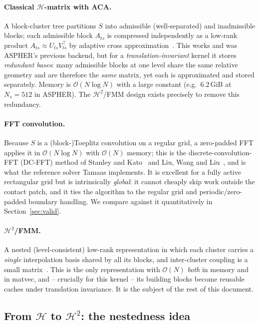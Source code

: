 \documentclass[11pt,a4paper]{article}
\newcommand{\Order}{\mathcal{O}}
\newcommand{\Htwo}{\mathcal{H}^2}
\newcommand{\Hmat}{\mathcal{H}}
\theoremstyle{definition}
\theoremstyle{remark}
\begin{document}
\paragraph{Classical $\Hmat$-matrix with ACA.} A block-cluster tree partitions
$S$ into admissible (well-separated) and inadmissible blocks; each admissible
block $A_{ts}$ is compressed independently as a low-rank product
$A_{ts}\approx U_{ts}V_{ts}^\top$ by adaptive cross
approximation~\cite{Bebendorf2008,Hackbusch2015}. This works and was ASPHER's
previous backend, but for a \emph{translation-invariant} kernel it stores
\emph{redundant bases}: many admissible blocks at one level share the same
relative geometry and are therefore the \emph{same} matrix, yet each is
approximated and stored separately. Memory is $\Order(N\log N)$ with a large
constant (e.g.\ $6.2$\,GiB at $N_s=512$ in ASPHER). The $\Htwo$/FMM design
exists precisely to remove this redundancy.

\paragraph{FFT convolution.} Because $S$ is a (block-)Toeplitz convolution on a
regular grid, a zero-padded FFT applies it in $\Order(N\log N)$ with $\Order(N)$
memory; this is the discrete-convolution-FFT (DC-FFT) method of Stanley and
Kato~\cite{StanleyKato1997} and Liu, Wang and Liu~\cite{LiuWangLiu2000}, and is
what the reference solver Tamaas implements. It is excellent for a fully active
rectangular grid but is intrinsically \emph{global}: it cannot cheaply skip work
outside the contact patch, and it ties the algorithm to the regular grid and
periodic/zero-padded boundary handling. We compare against it quantitatively in
Section~\ref{sec:valid}.

\paragraph{$\Htwo$/FMM.} A nested (level-consistent) low-rank representation in
which each cluster carries a \emph{single} interpolation basis shared by all its
blocks, and inter-cluster coupling is a small matrix~\cite{FongDarve2009,Hackbusch2015,BoerHugesAnda2006}.
This is the only representation with $\Order(N)$ \emph{both} in memory and in
matvec, and -- crucially for this kernel -- its building blocks become reusable
caches under translation invariance. It is the subject of the rest of this
document.

\subsection{From $\Hmat$ to $\Htwo$: the nestedness idea}
\end{document}
